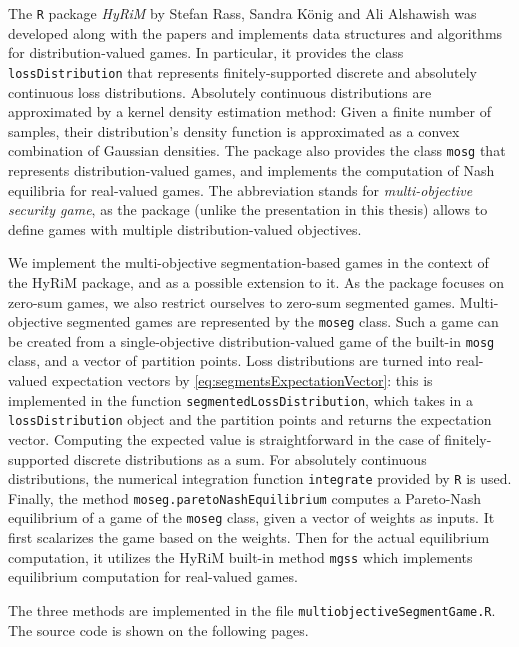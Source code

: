 \documentclass[a4paper]{scrreprt}
\theoremstyle{definition}
\begin{document}
    The \texttt{R} package \emph{HyRiM} \cite{bib:hyrimPackage} by Stefan Rass, Sandra König and Ali Alshawish was developed along with the papers \cite{bib:rassGameRiskManagI,bib:rassGameRiskManagII,bib:rassGameRiskManagIII} and implements data structures and algorithms for distribution-valued games.
    In particular, it provides the class \texttt{lossDistribution} that represents finitely-supported discrete and absolutely continuous loss distributions. Absolutely continuous distributions are approximated by a kernel density estimation method: Given a finite number of samples, their distribution's density function is approximated as a convex combination of Gaussian densities. The package also provides the class \texttt{mosg} that represents distribution-valued games, and implements the computation of Nash equilibria for real-valued games. The abbreviation stands for \emph{multi-objective security game}, as the package (unlike the presentation in this thesis) allows to define games with multiple distribution-valued objectives.
    
    We implement the multi-objective segmentation-based games in the context of the HyRiM package, and as a possible extension to it. As the package focuses on zero-sum games, we also restrict ourselves to zero-sum segmented games.
    Multi-objective segmented games are represented by the \texttt{moseg} class. Such a game can be created from a single-objective distribution-valued game of the built-in \texttt{mosg} class, and a vector of partition points.
    Loss distributions are turned into real-valued expectation vectors by \eqref{eq:segmentsExpectationVector}: this is implemented in the function \texttt{segmentedLossDistribution}, which takes in a \texttt{lossDistribution} object and the partition points and returns the expectation vector.
    Computing the expected value is straightforward in the case of finitely-supported discrete distributions as a sum. For absolutely continuous distributions, the numerical integration function \texttt{integrate} provided by \texttt{R} is used.
    Finally, the method \texttt{moseg.paretoNashEquilibrium} computes a Pareto-Nash equilibrium of a game of the \texttt{moseg} class, given a vector of weights as inputs.
    It first scalarizes the game based on the weights.
    Then for the actual equilibrium computation, it utilizes the HyRiM built-in method \texttt{mgss} which implements equilibrium computation for real-valued games.
    
    The three methods are implemented in the file \texttt{multiobjectiveSegmentGame.R}. The source code is shown on the following pages.
    
\end{document}
